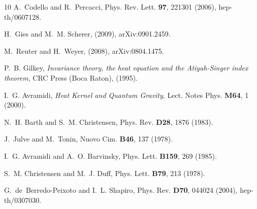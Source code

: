 \documentclass[preprint,preprintnumbers,amsmath,amssymb,nofootinbib,APS]{revtex4}
\newcommand{\2}{\sqrt{2\,}}
\begin{document}
\begin{thebibliography}{10}
A.~Codello and R.~Percacci,
\newblock Phys. Rev. Lett. {\bf 97}, 221301 (2006), hep-th/0607128.

H.~Gies and M.~M. Scherer,
\newblock (2009), arXiv:0901.2459.

M.~Reuter and H.~Weyer,
\newblock (2008), arXiv:0804.1475.

P.~B. Gilkey, {\it Invariance theory, the heat equation and the Atiyah-Singer
                  index theorem}, 
\newblock CRC Press (Boca Raton), (1995).

I.~G. Avramidi, {\it Heat Kernel and Quantum Gravity},
\newblock Lect. Notes Phys. {\bf M64}, 1 (2000).

N.~H. Barth and S.~M. Christensen,
\newblock Phys. Rev. {\bf D28}, 1876 (1983).

J.~Julve and M.~Tonin,
\newblock Nuovo Cim. {\bf B46}, 137 (1978).

I.~G. Avramidi and A.~O. Barvinsky,
\newblock Phys. Lett. {\bf B159}, 269 (1985).

S.~M. Christensen and M.~J. Duff,
\newblock Phys. Lett. {\bf B79}, 213 (1978).

G.~de~Berredo-Peixoto and I.~L. Shapiro,
\newblock Phys. Rev. {\bf D70}, 044024 (2004), hep-th/0307030.


\end{thebibliography}
\end{document}
